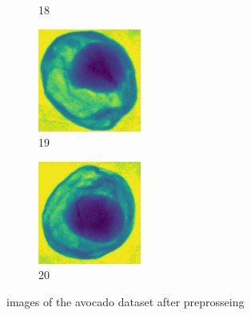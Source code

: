 \documentclass[11pt]{article}
\begin{document}
\begin{figure}[!h]
\begin{subfigure}[b]{0.22\textwidth}
         \caption{18}
         \label{fig:avo_17}
     \end{subfigure}
     \hfill
     \begin{subfigure}[b]{0.22\textwidth}
         \centering
         \includegraphics[width=\textwidth]{figurer/avocado_dataset/avo_18.jpg}
         \caption{19}
         \label{fig:avo_18}
     \end{subfigure}
     \hfill
     \begin{subfigure}[b]{0.22\textwidth}
         \centering
         \includegraphics[width=\textwidth]{figurer/avocado_dataset/avo_19.jpg}
         \caption{20}
         \label{fig:avo_19}
     \end{subfigure}
     \caption{images of the avocado dataset after preprosseing}
    \end{figure}
\end{document}

